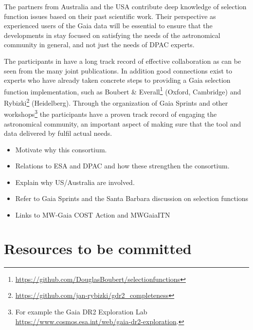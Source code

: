The partners from Australia and the USA contribute deep knowledge of selection function issues based on their past scientific work. Their perspective as experienced users of the Gaia data will be essential to ensure that the developments in {\acro} stay focused on satisfying the needs of the astronomical community in general, and not just the needs of DPAC experts.

The participants in {\acro} have a long track record of effective collaboration as can be seen from the many joint publications. In addition good connections exist to experts who have already taken concrete steps to providing a Gaia selection function implementation, such as Boubert \& Everall\footnote{\url{https://github.com/DouglasBoubert/selectionfunctions}} (Oxford, Cambridge) and Rybizki\footnote{\url{https://github.com/jan-rybizki/gdr2_completeness}} (Heidelberg). Through the organization of Gaia Sprints and other workshops\footnote{For example the Gaia DR2 Exploration Lab \url{https://www.cosmos.esa.int/web/gaia-dr2-exploration}.} the participants have a proven track record of engaging the astronomical community, an important aspect of making sure that the tool and data delivered by {\acro} fulfil actual needs.

\begin{itemize}
    \item Motivate why this consortium.
    \item Relations to ESA and DPAC and how these strengthen the consortium.
    \item Explain why US/Australia are involved.
    \item Refer to Gaia Sprints and the Santa Barbara discussion on selection functions
    \item Links to MW-Gaia COST Action and MWGaiaITN
\end{itemize}

\section{Resources to be committed}
\label{sec:resources}

\makesummaryofefforttable


\makecoststable

